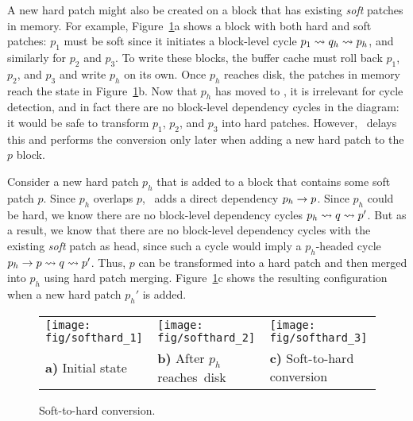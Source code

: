 A new hard patch might also be created on a block
that has existing \emph{soft} patches in memory.
%
For example, Figure~\ref{f:soft2hard}a shows a block with both hard and
soft patches: $p_1$ must be soft since it initiates a block-level cycle
$p_1 \leadsto q_h \leadsto p_h$, and similarly for $p_2$ and $p_3$.
%
To write these blocks, the buffer cache must roll back $p_1$, $p_2$, and
$p_3$ and write $p_h$ on its own.
%
Once $p_h$ reaches disk, the patches in memory reach the state in
Figure~\ref{f:soft2hard}b.
%
Now that $p_h$ has moved to \PDisk, it is irrelevant for cycle detection,
and in fact there are no block-level dependency cycles in the diagram: it
would be safe to transform $p_1$, $p_2$, and $p_3$ into hard patches.
%
However, \Kudos\ delays this and performs the conversion only later when
adding a new hard patch to the $p$ block. 


Consider a new hard patch $p_h$ that is added to a block that contains some
soft patch $p$.
%
Since $p_h$ overlaps $p$, \Kudos\ adds a direct dependency $p_h \rightarrow p$.
%
Since $p_h$ could be hard, we know there are no block-level dependency cycles
$p_h \leadsto q \leadsto p'$.
%
But as a result, we know that there are no block-level dependency cycles
with the existing \emph{soft} patch as head, since such a cycle would imply
a $p_h$-headed cycle $p_h \rightarrow p \leadsto q \leadsto p'$.
%
Thus, $p$ can be transformed into a hard patch and then merged into $p_h$
using hard patch merging.
%
Figure~\ref{f:soft2hard}c shows the resulting configuration when a new hard
patch $p_h'$ is added.


\begin{figure}
\centering
\begin{small}
\begin{tabular}{@{}p{.32\hsize}@{~~}p{.32\hsize}@{~~}p{.32\hsize}@{}}
\texttt{[image: fig/softhard\_1]} &
\texttt{[image: fig/softhard\_2]} &
\texttt{[image: fig/softhard\_3]} \\
\centering \textbf{a)} Initial state &
\centering \textbf{b)} After $p_h$ reaches~disk &
\centering \textbf{c)} Soft-to-hard conversion
\end{tabular}
\end{small}
\caption{Soft-to-hard conversion.}
\label{f:soft2hard}
\end{figure}



